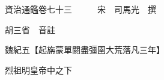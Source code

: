










 


 
 


 

  
  
  
  
  





  
  
  
  
  
 
  

  

  
  
  



  

 
 

  
   




  

  
  


  　　資治通鑑卷七十三　　　宋　司馬光　撰

　　胡三省　音註

　　魏紀五【起旃蒙單閼盡彊圉大荒落凡三年】

　　烈祖明皇帝中之下

